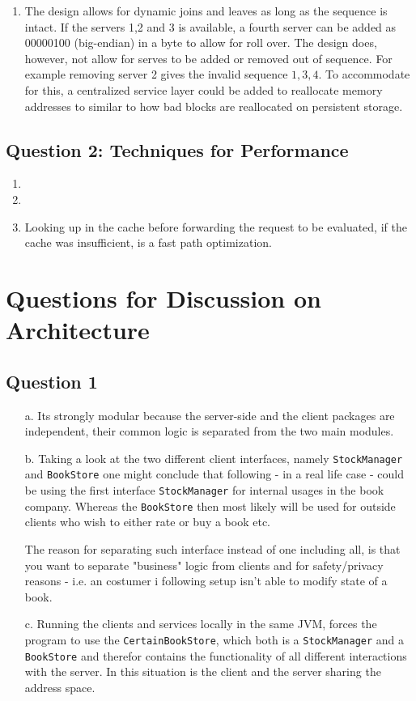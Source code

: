 \documentclass[10pt,a4paper]{article}
\begin{document}
\begin{enumerate}
	\item The design allows for dynamic joins and leaves as long as the sequence is intact. If the servers 1,2 and 3 is available, a fourth server can be added as 00000100 (big-endian) in a byte to allow for roll over. The design does, however, not allow for serves to be added or removed out of sequence. For example removing server 2 gives the invalid sequence $1,3,4$. To accommodate for this, a centralized service layer could be added to reallocate memory addresses to similar to how bad blocks are reallocated on persistent storage.
	
	
\end{enumerate}

\subsection*{Question 2: Techniques for Performance}
\begin{enumerate}
	\item 
	
	
	\item
	\item
	Looking up in the cache before forwarding the request to be evaluated, if the cache was insufficient, is a fast path optimization. 	
	
\end{enumerate}

\section*{Questions for Discussion on Architecture}
\subsection*{Question 1}
\begin{itemize}
	\item[a.] Its strongly modular because the server-side and the client packages are independent, their common logic is separated from the two main modules.
	\item[b.] Taking a look at the two different client interfaces, namely \texttt{StockManager} and \texttt{BookStore} one might conclude that following - in a real life case - could be using the first interface \texttt{StockManager} for internal usages in the book company. Whereas the \texttt{BookStore} then most likely will be used for outside clients who wish to either rate or buy a book etc.
	\newline
	
	The reason for separating such interface instead of one including all, is that you want to separate "business" logic from clients and for safety/privacy reasons - i.e. an costumer i following setup isn't able to modify state of a book.
	\item[c.] Running the clients and services locally in the same JVM, forces the program to use the \texttt{CertainBookStore}, which both is a \texttt{StockManager} and a \texttt{BookStore} and therefor contains the functionality of all different interactions with the server. In this situation is the client and the server sharing the address space.
\end{itemize}
\end{document}
